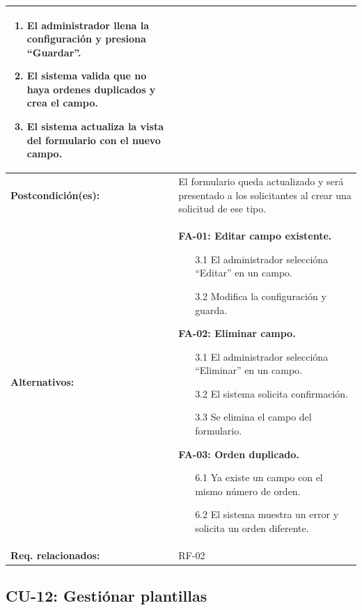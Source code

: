 \begin{longtable}{|L{4cm}|L{9.5cm}|}
\begin{enumerate}[nosep, leftmargin=*]
\begin{itemize}[nosep]
            \end{itemize}
        \item El administrador llena la configuración y presiona ``Guardar''.
        \item El sistema valida que no haya ordenes duplicados y crea el campo.
        \item El sistema actualiza la vista del formulario con el nuevo campo.
    \end{enumerate} \\
    \hline
    \textbf{Postcondición(es):} & El formulario queda actualizado y será presentado a los solicitantes al crear una solicitud de ese tipo. \\
    \hline
    \textbf{Alternativos:} &
    \textbf{FA-01: Editar campo existente.}
    \begin{enumerate}[nosep, leftmargin=*]
        \item[3.1] El administrador seleccióna ``Editar'' en un campo.
        \item[3.2] Modifica la configuración y guarda.
    \end{enumerate}
    \vspace{0.2cm}
    \textbf{FA-02: Eliminar campo.}
    \begin{enumerate}[nosep, leftmargin=*]
        \item[3.1] El administrador seleccióna ``Eliminar'' en un campo.
        \item[3.2] El sistema solicita confirmación.
        \item[3.3] Se elimina el campo del formulario.
    \end{enumerate}
    \vspace{0.2cm}
    \textbf{FA-03: Orden duplicado.}
    \begin{enumerate}[nosep, leftmargin=*]
        \item[6.1] Ya existe un campo con el mismo número de orden.
        \item[6.2] El sistema muestra un error y solicita un orden diferente.
    \end{enumerate} \\
    \hline
    \textbf{Req. relacionados:} & RF-02 \\
    \hline
\end{longtable}

\subsection{CU-12: Gestiónar plantillas}


